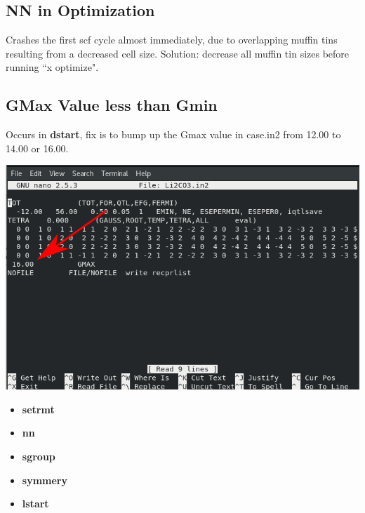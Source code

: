 \documentclass[12pt]{article}
\begin{document}
\subsection{NN in Optimization}
Crashes the first scf cycle almost immediately, due to overlapping muffin tins resulting from a decreased cell size.  Solution: decrease all muffin tin sizes before running ``x optimize".


\subsection{GMax Value less than Gmin}

Occurs in \textbf{dstart}, fix is to bump up the Gmax value in case.in2 from 12.00 to 14.00 or 16.00.

\includegraphics[scale=0.5]{./images/gmax_err.png}



\begin{itemize}
	\item \textbf{setrmt}
	\item \textbf{nn}
	\item \textbf{sgroup}
	\item  \textbf{symmery}
	\item \textbf{lstart}
	
\end{itemize}
\end{document}
